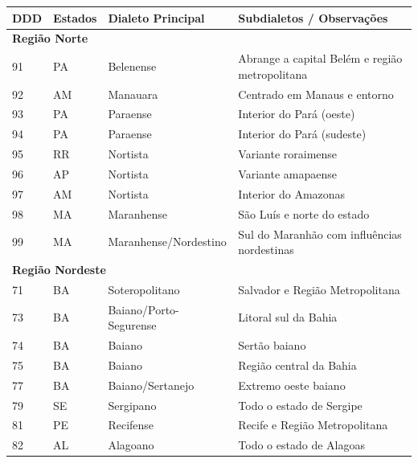 \begin{table}[ht]
  \centering
  \tiny
  \setlength{\tabcolsep}{6pt}
  \begin{tabular}{llll}
    \toprule
    \textbf{DDD} & \textbf{Estados} & \textbf{Dialeto Principal} & \textbf{Subdialetos / Observações} \\
    \midrule
    \multicolumn{4}{l}{\textbf{Região Norte}} \\ 
    91 & PA      & Belenense             & Abrange a capital Belém e região metropolitana \\
    92 & AM      & Manauara              & Centrado em Manaus e entorno                  \\
    93 & PA      & Paraense              & Interior do Pará (oeste)                      \\
    94 & PA      & Paraense              & Interior do Pará (sudeste)                    \\
    95 & RR      & Nortista              & Variante roraimense                           \\
    96 & AP      & Nortista              & Variante amapaense                            \\
    97 & AM      & Nortista              & Interior do Amazonas                          \\
    98 & MA      & Maranhense            & São Luís e norte do estado                    \\
    99 & MA      & Maranhense/Nordestino & Sul do Maranhão com influências nordestinas   \\
    \midrule
    \multicolumn{4}{l}{\textbf{Região Nordeste}} \\ 
    71 & BA & Soteropolitano          & Salvador e Região Metropolitana          \\
    73 & BA & Baiano/Porto-Segurense  & Litoral sul da Bahia                     \\
    74 & BA & Baiano                  & Sertão baiano                            \\
    75 & BA & Baiano                  & Região central da Bahia                  \\
    77 & BA & Baiano/Sertanejo        & Extremo oeste baiano                     \\
    79 & SE & Sergipano               & Todo o estado de Sergipe                 \\
    81 & PE & Recifense               & Recife e Região Metropolitana            \\
    82 & AL & Alagoano                & Todo o estado de Alagoas                 \\

\end{tabular}
\end{table}
